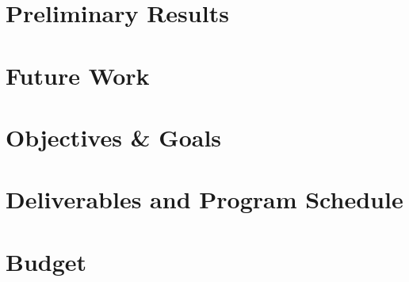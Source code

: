 \documentclass[a4paper,10pt]{article}
\begin{document}


\section{Preliminary Results}\label{curr}



\section{Future Work}\label{future}



\section{Objectives \& Goals}\label{goals}



\section{Deliverables and Program Schedule}\label{deliverables}



\section{Budget}



\printbibliography
\end{document}
